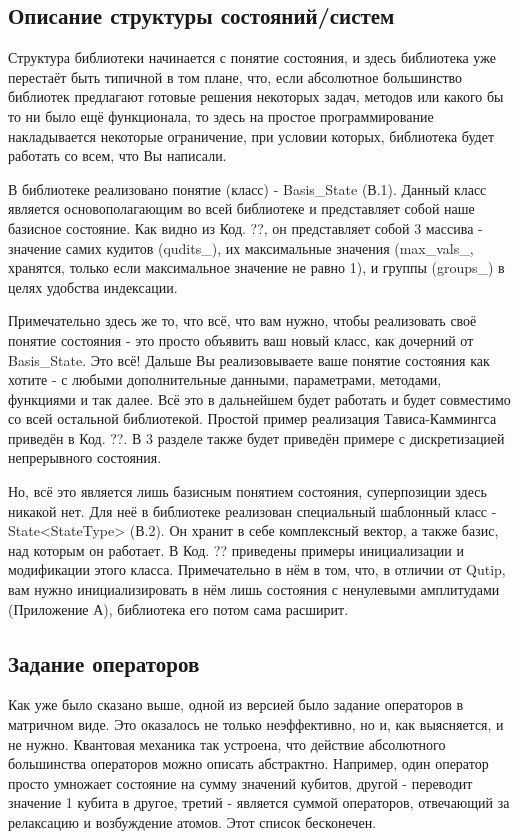 \documentclass[aps,twocolumn,pra,showpacs,amsmath,amssymb,showkeys,10pt]{revtex4-2}
\begin{document}
    \subsection{Описание структуры состояний/систем}
    Структура библиотеки начинается с понятие состояния, и здесь библиотека уже перестаёт быть типичной в том плане, что, если абсолютное большинство библиотек предлагают готовые решения некоторых задач,
    методов или какого бы то ни было ещё функционала, то здесь на простое программирование накладывается некоторые ограничение, при условии которых, библиотека будет работать со всем, что Вы написали.

    В библиотеке реализовано понятие (класс) - Basis\_State (В.1). Данный класс является основополагающим во всей библиотеке и представляет собой наше базисное состояние. Как видно из Код. ??, он 
    представляет собой 3 массива - значение самих кудитов (qudits\_), их максимальные значения (max\_vals\_, хранятся, только если максимальное значение не равно 1), и группы (groups\_) в целях удобства 
    индексации.

    Примечательно здесь же то, что всё, что вам нужно, чтобы реализовать своё понятие состояния - это просто объявить ваш новый класс, как дочерний от Basis\_State. Это всё! Дальше Вы реализовываете 
    ваше понятие состояния как хотите - с любыми дополнительные данными, параметрами, методами, функциями и так далее. Всё это в дальнейшем будет работать
    и будет совместимо со всей остальной библиотекой. Простой пример реализация Тависа-Каммингса приведён в Код. ??. В 3 разделе также будет приведён примере с дискретизацией непрерывного состояния.

    Но, всё это является лишь базисным понятием состояния, суперпозиции здесь никакой нет. Для неё в библиотеке реализован специальный шаблонный класс - State<StateType> (В.2). Он хранит
    в себе комплексный вектор, а также базис, над которым он работает. В Код. ?? приведены примеры инициализации и модификации этого класса. Примечательно в нём в том, что, в отличии от Qutip,
    вам нужно инициализировать в нём лишь состояния с ненулевыми амплитудами (Приложение А), библиотека его потом сама расширит.

    \subsection{Задание операторов}
    Как уже было сказано выше, одной из версией было задание операторов в матричном виде. Это оказалось не только неэффективно, но и, как выясняется, и не нужно. Квантовая механика так устроена, что 
    действие абсолютного большинства операторов можно описать абстрактно. Например, один оператор просто умножает состояние на сумму значений кубитов, другой - переводит значение 1 кубита в другое, 
    третий - является суммой операторов, отвечающий за релаксацию и возбуждение атомов. Этот список бесконечен.
    
\end{document}
